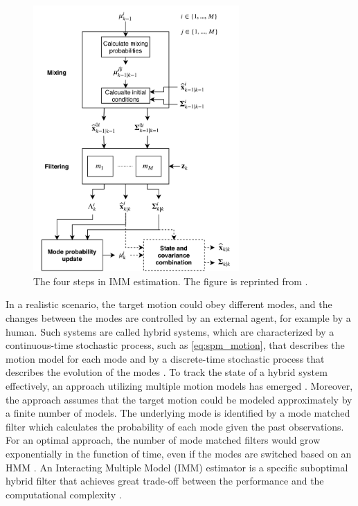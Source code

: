 \documentclass[english, 12pt, a4paper, elec, utf8, a-1b, online]{aaltothesis}
\begin{document}
\begin{figure}[b]
    \centering
    \includegraphics[width=0.7\textwidth]{figures/IMM_figure.pdf}
    \caption{
    The four steps in IMM estimation. 
    The figure is reprinted from \cite{BarShalom2001}.}
    \label{fig:IMM}
\end{figure}

In a realistic scenario, the target motion could obey different modes, and the changes between the modes are controlled by an external agent, for example by a human.
Such systems are called hybrid systems, which are characterized by a continuous-time stochastic process, such as \eqref{eq:spm_motion}, that describes the motion model for each mode and by a discrete-time stochastic process that describes the evolution of the modes \cite{Mazor1998}.
To track the state of a hybrid system effectively, an approach utilizing multiple motion models has emerged \cite{BarShalom2001}.
Moreover, the approach assumes that the target motion could be modeled approximately by a finite number of models.
The underlying mode is identified by a mode matched filter which calculates the probability of each mode given the past observations.
For an optimal approach, the number of mode matched filters would grow exponentially in the function of time, even if the modes are switched based on an HMM \cite{BarShalom2001}.
An Interacting Multiple Model (IMM) estimator is a specific suboptimal hybrid filter that achieves great trade-off between the performance and the computational complexity \cite{Mazor1998}.
\end{document}
